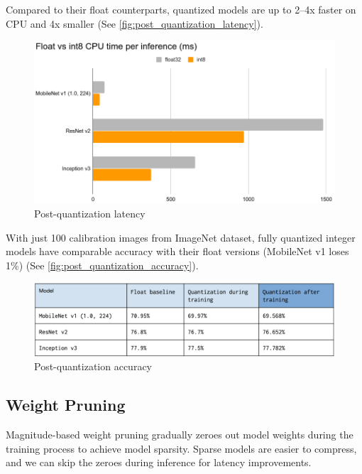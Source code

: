 Compared to their float counterparts, quantized models are up to 2–4x faster on
CPU and 4x smaller (See \autoref{fig:post_quantization_latency}).

\begin{figure}[ht]
    \includegraphics[width=\textwidth]{images/introduction/post_quantization_latency.png}
    \centering
    \caption{Post-quantization latency}\label{fig:post_quantization_latency}
\end{figure}

With just 100 calibration images from ImageNet dataset, fully quantized integer
models have comparable accuracy with their float versions (MobileNet v1 loses
1\%) (See \autoref{fig:post_quantization_accuracy}).

\begin{figure}[ht]
    \includegraphics[width=\textwidth]{images/introduction/post_quantization_accuracy.png}
    \centering
    \caption{Post-quantization accuracy}\label{fig:post_quantization_accuracy}
\end{figure}

\subsection{Weight Pruning}
Magnitude-based weight pruning gradually zeroes out model weights during the
training process to achieve model sparsity. Sparse models are easier to
compress, and we can skip the zeroes during inference for latency improvements.

